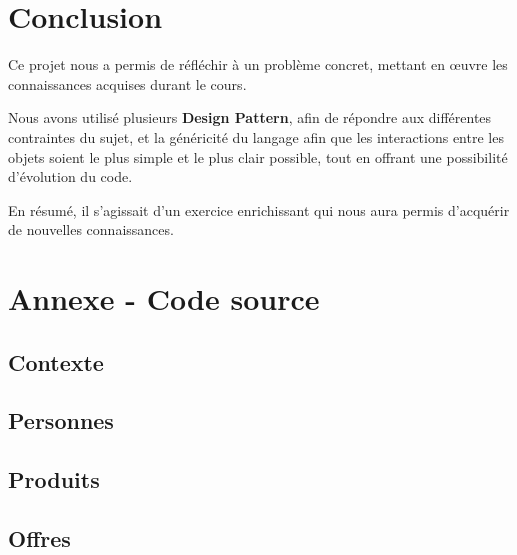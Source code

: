 \documentclass{article}
\newcommand{\code}[1]{}
\begin{document}
\clearpage %

\vfill
\section*{Conclusion}

Ce projet nous a permis de réfléchir à un problème concret, mettant en œuvre les connaissances acquises durant le cours.
\par
Nous avons utilisé plusieurs \textbf{Design Pattern}, afin de répondre aux différentes contraintes du sujet,
et la généricité du langage afin que les interactions entre les objets soient le plus simple et le plus clair possible, tout en offrant une possibilité d'évolution du code.
\par
En résumé, il s'agissait d'un exercice enrichissant qui nous aura permis d'acquérir de nouvelles connaissances.

 \clearpage
 
\section*{Annexe - Code source}

\subsection*{Contexte}
\code{Contexte}
\code{Alerte}
\code{Panier}

\subsection*{Personnes}
\code{Personne}
\code{NomStatut}
\code{Statut}
\code{Adherent}
\code{Employe}
\code{Visiteur}

\subsection*{Produits}
\code{Produit}
\code{NomCategorie}
\code{Culture}
\code{Hightech}
\code{Livres}
\code{Spectacles}
\code{Tablette}

\subsection*{Offres}
\code{Offre}
\code{OffreEmploye}
\code{OffreFidelite}
\code{OffreFlash}
\code{OffreProduit}
\end{document}
